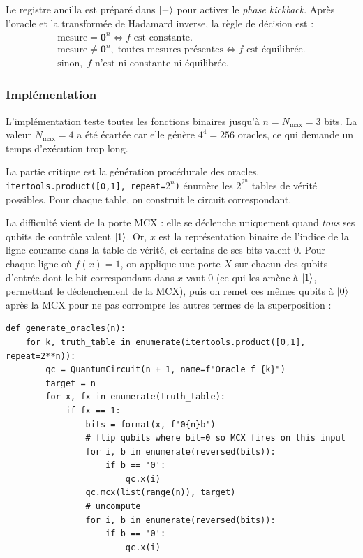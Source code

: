 \documentclass{ceri/sty/rapport}
\begin{document}
Le registre ancilla est préparé dans $\ket{-}$ pour activer le \emph{phase
kickback}. Après l'oracle et la transformée de Hadamard inverse, la règle de
décision est :
\begin{gather*}
  \text{mesure} = \mathbf{0}^n \iff f \text{ est constante.} \\
  \text{mesure} \neq \mathbf{0}^n,\; \text{toutes mesures présentes} \iff f \text{ est équilibrée.} \\
  \text{sinon},\; f \text{ n'est ni constante ni équilibrée.}
\end{gather*}

\subsubsection{Implémentation}

L'implémentation teste toutes les fonctions binaires jusqu'à
$n = N_{\max} = 3$ bits. La valeur $N_{\max} = 4$ a été écartée car elle génère
$4^4 = 256$ oracles, ce qui demande un temps d'exécution trop long.

La partie critique est la génération procédurale des oracles.
\texttt{itertools.product([0,1], repeat=$2^n$)} énumère les $2^{2^n}$ tables de
vérité possibles. Pour chaque table, on construit le circuit correspondant.

La difficulté vient de la porte MCX : elle se déclenche uniquement quand
\emph{tous} ses qubits de contrôle valent $\ket{1}$. Or, $x$ est la représentation
binaire de l'indice de la ligne courante dans la table de vérité, et certains
de ses bits valent $0$. Pour chaque ligne où $f(x) = 1$, on applique une
porte $X$ sur chacun des qubits d'entrée dont le bit correspondant dans $x$
vaut $0$ (ce qui les amène à $\ket{1}$, permettant le déclenchement de la MCX),
puis on remet ces mêmes qubits à $\ket{0}$ après la MCX pour ne pas corrompre
les autres termes de la superposition :

\begin{minipage}{\linewidth}
\begin{lstlisting}
def generate_oracles(n):
    for k, truth_table in enumerate(itertools.product([0,1], repeat=2**n)):
        qc = QuantumCircuit(n + 1, name=f"Oracle_f_{k}")
        target = n
        for x, fx in enumerate(truth_table):
            if fx == 1:
                bits = format(x, f'0{n}b')
                # flip qubits where bit=0 so MCX fires on this input
                for i, b in enumerate(reversed(bits)):
                    if b == '0':
                        qc.x(i)
                qc.mcx(list(range(n)), target)
                # uncompute
                for i, b in enumerate(reversed(bits)):
                    if b == '0':
                        qc.x(i)
\end{lstlisting}
\end{minipage}
\end{document}
